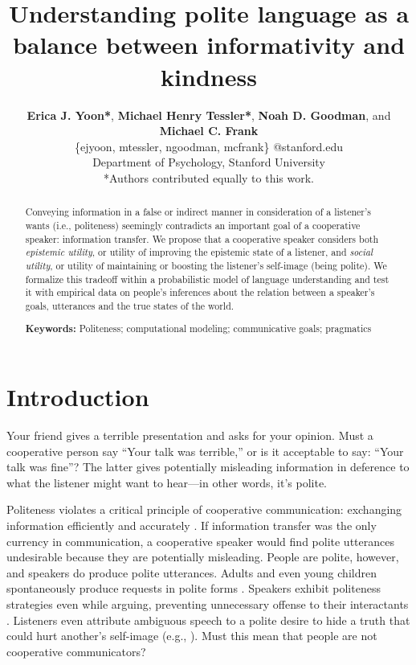 \documentclass[10pt,letterpaper]{article}
\title{Understanding polite language as a balance between informativity and kindness}
\author{ {\large \bf Erica J. Yoon*}, {\large \bf Michael Henry Tessler*}, {\large \bf Noah D. Goodman}, and {\large \bf Michael C. Frank}   \\
\{ejyoon, mtessler, ngoodman, mcfrank\} @stanford.edu \\
  Department of Psychology, Stanford University \\
  *Authors contributed equally to this work.}
\begin{document}
\maketitle


\begin{abstract}

Conveying information in a false or indirect manner in consideration of a listener's wants (i.e., politeness)
seemingly contradicts an important goal of a cooperative speaker: information transfer.
We propose that a cooperative speaker considers both
\emph{epistemic utility}, or utility of improving the epistemic state of a listener,
and \emph{social utility}, or utility of maintaining or boosting the listener's self-image (being polite).
We formalize this tradeoff within a probabilistic model of language understanding and test it with empirical data on people's inferences about the relation between a speaker's goals, utterances and the true states of the world.

\textbf{Keywords:}
Politeness; computational modeling; communicative goals; pragmatics

\end{abstract}


\section{Introduction}
Your friend gives a terrible presentation and asks for your opinion.
Must a cooperative person say ``Your talk was terrible,'' or is it acceptable to say: ``Your talk was fine''?
The latter gives potentially misleading information in deference to what the listener might want to hear---in other words, it's polite.

Politeness violates a critical principle of cooperative communication: exchanging information efficiently and accurately \cite{Grice1975}.
If information transfer was the only currency in communication, a cooperative speaker would find polite utterances undesirable because they are potentially misleading.
People are polite, however, and speakers do produce polite utterances.
Adults and even young children spontaneously produce requests in polite forms \cite{clark1980, axia1985}.
Speakers exhibit politeness strategies even while arguing, preventing unnecessary offense to their interactants \cite{holtgraves1997}.
Listeners even attribute ambiguous speech to a polite desire to hide a truth that could hurt another's self-image (e.g., ).
Must this mean that people are not cooperative communicators?
\end{document}
